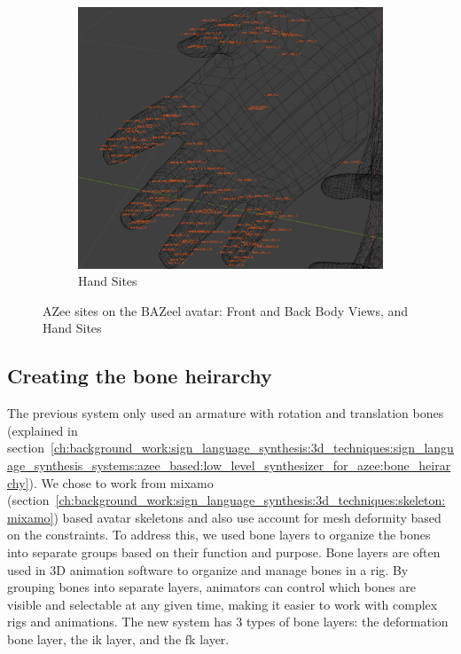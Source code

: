 \documentclass[../../main.tex]{subfiles}
\begin{document}
\begin{figure}[h]
\begin{subfigure}[b]{0.3\textwidth}
        \includegraphics[width=\textwidth]{chapters/avatar_creation_pose_synthesis/images/sites_hand.png}
        \caption{Hand Sites}
        \label{fig:sites_hand}
    \end{subfigure}
    \caption{AZee sites on the BAZeel avatar: Front and Back Body Views, and Hand Sites}
    \label{fig:sites_bazeel_combined}
\end{figure}

\subsection{Creating the bone heirarchy}
\label{ch:avatar_creation_pose_synthesis:proc_rig_signing_avatars:bone_layers}

The previous system only used an armature with rotation and translation bones (explained in section~\ref{ch:background_work:sign_language_synthesis:3d_techniques:sign_language_synthesis_systems:azee_based:low_level_synthesizer_for_azee:bone_heirarchy}). We chose to work from mixamo (section~\ref{ch:background_work:sign_language_synthesis:3d_techniques:skeleton:mixamo}) based avatar skeletons and also use account for mesh deformity based on the constraints. To address this, we used bone layers to organize the bones into separate groups based on their function and purpose. Bone layers are often used in 3D animation software to organize and manage bones in a rig. By grouping bones into separate layers, animators can control which bones are visible and selectable at any given time, making it easier to work with complex rigs and animations. The new system has 3 types of bone layers: the deformation bone layer, the \gls{ik} layer, and the \gls{fk} layer.
\end{document}
